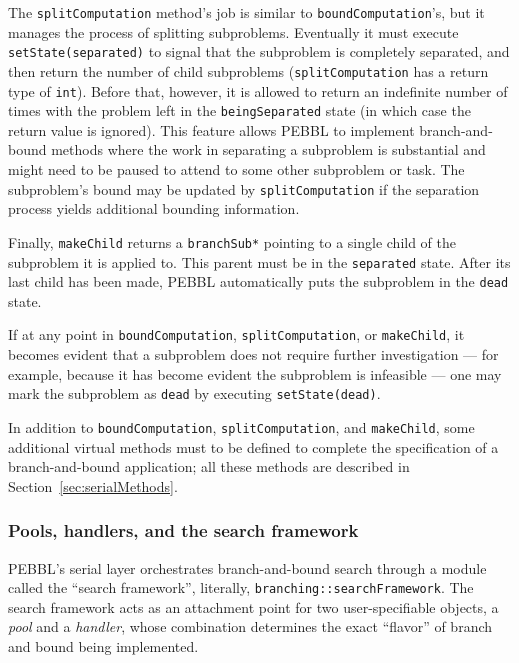 The \texttt{splitComputation} method's job is similar to
\texttt{boundComputation}'s, but it manages the process of splitting
subproblems.  Eventually it must execute \texttt{setState(separated)}
to signal that the subproblem is completely separated, and then return
the number of child subproblems (\texttt{splitComputation} has a
return type of \texttt{int}).  Before that, however, it is allowed to
return an indefinite number of times with the problem left in the
\texttt{beingSeparated} state (in which case the return value is
ignored).  
This feature allows PEBBL to implement
branch-and-bound methods where the work in separating a subproblem is
substantial and might need to be paused to attend to some other
subproblem or task.  The subproblem's bound may be updated by
\texttt{splitComputation} if the separation process yields additional
bounding information.

Finally, \texttt{makeChild} returns a \texttt{branchSub*} pointing to
a single child of the subproblem it is applied to.  This parent must
be in the \texttt{separated} state.  After its last child has been
made, PEBBL automatically puts the subproblem in the \texttt{dead}
state.

If at any point in \texttt{boundComputation},
\texttt{splitComputation}, or \texttt{makeChild}, it becomes evident
that a subproblem does not require further investigation --- for
example, because it has become evident the subproblem is infeasible
--- one may mark the subproblem as \texttt{dead} by executing
\texttt{setState(dead)}.

In addition to \texttt{boundComputation}, \texttt{splitComputation},
and \texttt{makeChild}, some additional virtual methods must to be
defined to complete the specification of a branch-and-bound
application; all these methods are described in
Section~\ref{sec:serialMethods}.


\subsubsection{Pools, handlers, and the search framework}
\label{sec:framework}

PEBBL's serial layer orchestrates branch-and-bound search through a
module called the ``search framework'', literally,
\texttt{branching::searchFramework}.  The search framework acts as an
attachment point for two user-specifiable objects, a \emph{pool} and
a \emph{handler}, whose combination determines the exact ``flavor''
of branch and bound being implemented.

